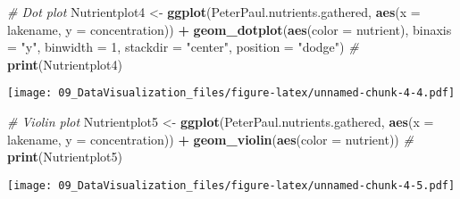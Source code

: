 \documentclass[]{article}
\newenvironment{Shaded}{\begin{snugshade}}{\end{snugshade}}
\newcommand{\KeywordTok}[1]{\textcolor[rgb]{0.13,0.29,0.53}{\textbf{#1}}}
\newcommand{\DataTypeTok}[1]{\textcolor[rgb]{0.13,0.29,0.53}{#1}}
\newcommand{\DecValTok}[1]{\textcolor[rgb]{0.00,0.00,0.81}{#1}}
\newcommand{\StringTok}[1]{\textcolor[rgb]{0.31,0.60,0.02}{#1}}
\newcommand{\CommentTok}[1]{\textcolor[rgb]{0.56,0.35,0.01}{\textit{#1}}}
\newcommand{\OperatorTok}[1]{\textcolor[rgb]{0.81,0.36,0.00}{\textbf{#1}}}
\newcommand{\NormalTok}[1]{#1}
\begin{document}
\begin{Shaded}
\begin{Highlighting}[]
\CommentTok{# Dot plot}
\NormalTok{Nutrientplot4 <-}
\StringTok{  }\KeywordTok{ggplot}\NormalTok{(PeterPaul.nutrients.gathered, }\KeywordTok{aes}\NormalTok{(}\DataTypeTok{x =}\NormalTok{ lakename, }\DataTypeTok{y =}\NormalTok{ concentration)) }\OperatorTok{+}
\StringTok{  }\KeywordTok{geom_dotplot}\NormalTok{(}\KeywordTok{aes}\NormalTok{(}\DataTypeTok{color =}\NormalTok{ nutrient), }\DataTypeTok{binaxis =} \StringTok{"y"}\NormalTok{, }\DataTypeTok{binwidth =} \DecValTok{1}\NormalTok{, }
               \DataTypeTok{stackdir =} \StringTok{"center"}\NormalTok{, }\DataTypeTok{position =} \StringTok{"dodge"}\NormalTok{) }\CommentTok{#}
\KeywordTok{print}\NormalTok{(Nutrientplot4)}
\end{Highlighting}
\end{Shaded}

\texttt{[image: 09\_DataVisualization\_files/figure-latex/unnamed-chunk-4-4.pdf]}

\begin{Shaded}
\begin{Highlighting}[]
\CommentTok{# Violin plot}
\NormalTok{Nutrientplot5 <-}
\StringTok{  }\KeywordTok{ggplot}\NormalTok{(PeterPaul.nutrients.gathered, }\KeywordTok{aes}\NormalTok{(}\DataTypeTok{x =}\NormalTok{ lakename, }\DataTypeTok{y =}\NormalTok{ concentration)) }\OperatorTok{+}
\StringTok{  }\KeywordTok{geom_violin}\NormalTok{(}\KeywordTok{aes}\NormalTok{(}\DataTypeTok{color =}\NormalTok{ nutrient)) }\CommentTok{#}
\KeywordTok{print}\NormalTok{(Nutrientplot5)}
\end{Highlighting}
\end{Shaded}

\texttt{[image: 09\_DataVisualization\_files/figure-latex/unnamed-chunk-4-5.pdf]}
\end{document}
